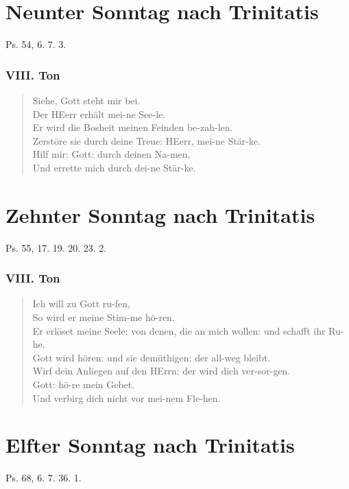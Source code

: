 \section{Neunter Sonntag nach Trinitatis}

Ps. 54, 6. 7. 3.

\subsubsection{VIII. Ton}
\begin{verse}
Siehe, Gott steht mir bei.\\
Der HEerr erhält mei-ne See-le.\\
Er wird die Bosheit meinen Feinden be-zah-len.\\
Zerstöre sie durch deine Treue: HEerr, mei-ne Stär-ke.\\
Hilf mir: Gott: durch deinen Na-men,\\
Und errette mich durch dei-ne Stär-ke.
\end{verse}

\section{Zehnter Sonntag nach Trinitatis}

Ps. 55, 17. 19. 20. 23. 2.

\subsubsection{VIII. Ton}
\begin{verse}
Ich will zu Gott ru-fen,\\
So wird er meine Stim-me hö-ren.\\
Er erlöset meine Seele: von denen, die an mich wollen: und schafft ihr Ru-he.\\
Gott wird hören: und sie demüthigen: der all-weg bleibt.\\
Wirf dein Anliegen auf den HErrn: der wird dich ver-sor-gen.\\
Gott: hö-re mein Gebet.\\
Und verbirg dich nicht vor mei-nem Fle-hen.
\end{verse}

\section{Elfter Sonntag nach Trinitatis}

Ps. 68, 6. 7. 36. 1.

